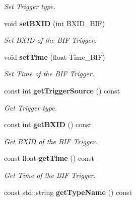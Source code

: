 \begin{DoxyCompactItemize}
\begin{DoxyCompactList}\small\item\em Set Trigger type. \item\end{DoxyCompactList}\item 
void {\bf setBXID} (int BXID\_\-BIF)\label{classCALICE_1_1BIFBlock_a089b2f4c9b362e0f95e8942f559bdfcd}

\begin{DoxyCompactList}\small\item\em Set BXID of the BIF Trigger. \item\end{DoxyCompactList}\item 
void {\bf setTime} (float Time\_\-BIF)\label{classCALICE_1_1BIFBlock_aa7286d6fe67c4c941537a0f156812247}

\begin{DoxyCompactList}\small\item\em Set Time of the BIF Trigger. \item\end{DoxyCompactList}\item 
const int {\bf getTriggerSource} () const \label{classCALICE_1_1BIFBlock_a27cde06f0406d3908efc8ec0b047332e}

\begin{DoxyCompactList}\small\item\em Get Trigger type. \item\end{DoxyCompactList}\item 
const int {\bf getBXID} () const \label{classCALICE_1_1BIFBlock_a7104742c4a7d0a3a17b0e195371ccf4c}

\begin{DoxyCompactList}\small\item\em Get BXID of the BIF Trigger. \item\end{DoxyCompactList}\item 
const float {\bf getTime} () const \label{classCALICE_1_1BIFBlock_a78df0b79c7631dd015db810eb5e653cd}

\begin{DoxyCompactList}\small\item\em Get Time of the BIF Trigger. \item\end{DoxyCompactList}\item 
const std::string {\bf getTypeName} () const \label{classCALICE_1_1BIFBlock_afedd9050ce2f4ae465c0c5c69ace43e9}


\end{DoxyCompactItemize}
